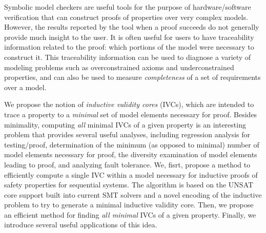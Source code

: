 Symbolic model checkers are useful tools for the purpose of hardware/software verification that can construct proofs of properties over
very complex models. However, the results reported by the tool
when a proof succeeds do not generally provide much insight to
the user. It is often useful for users to have traceability information related to the proof: which portions of the model were necessary to construct it.  This traceability information can be used to diagnose a variety of modeling problems such as overconstrained axioms and underconstrained properties, and can also be used to measure {\em completeness} of a set of requirements over a model.

We propose the notion of {\em inductive validity cores} (IVCs), which are intended to trace a property to a \emph{minimal} set of model elements necessary for proof. Besides minimality, computing \emph{all} minimal IVCs of a given property is
an interesting problem that provides several useful analyses, including
regression analysis for testing/proof, determination of the minimum (as
opposed to minimal) number of model elements necessary for proof, the
diversity examination of model elements leading to proof, and analyzing fault
tolerance.
We, fisrt, propose a method to efficiently compute a single IVC within a model necessary for inductive proofs of safety properties for sequential systems.  The algorithm is based on the UNSAT core support built into current SMT solvers and a novel encoding of the inductive problem to try to generate a minimal inductive validity core.
Then, we propose an efficient method for finding \emph{all minimal} IVCs of a
given property. Finally, we introduce several useful applications of this idea. 
